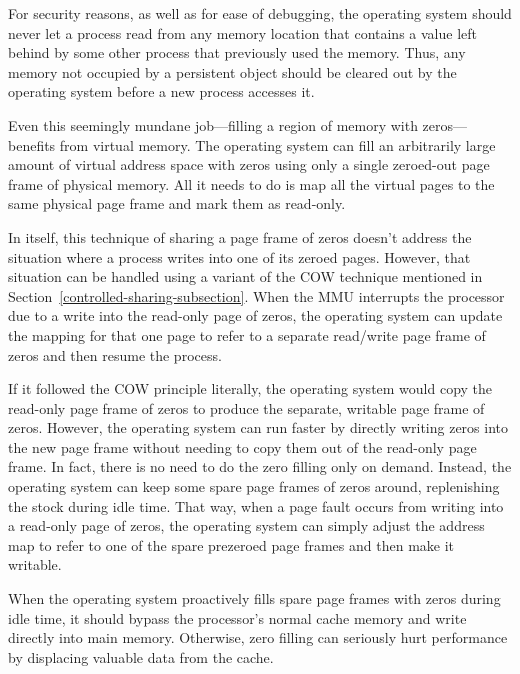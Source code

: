 For security reasons, as well as for ease of debugging, the operating
system should never let a process read from any memory location that
contains a value left behind by some other process that previously
used the memory.  Thus, any memory not occupied by a persistent
object should be cleared out by the operating system before a new process accesses it.

Even this seemingly mundane job---filling a region of memory with
zeros---benefits from virtual memory.  The operating system can fill
an arbitrarily large amount of virtual address space with zeros using
only a single zeroed-out page frame of physical memory.  All it needs
to do is map all the virtual pages to the same physical page frame
and mark them as read-only.

In itself, this technique of sharing a page frame of zeros
doesn't address the situation where a process writes into one of its
zeroed pages.  However, that situation can be handled using a variant of the COW technique
mentioned in Section~\ref{controlled-sharing-subsection}.  When the MMU
interrupts the processor due to a write into the read-only page of
zeros, the operating system can update the mapping for that one page
to refer to a separate read/write page frame of zeros and then resume the
process.

If it followed the COW principle literally, the operating system would
copy the read-only page frame of zeros to produce the separate,
writable page frame of zeros.  However, the operating system can run faster
by directly writing zeros into the new page frame without needing to
copy them out of the read-only page frame. In fact, there is no
need to do the zero filling only on demand.  Instead, the operating
system can keep some spare page frames of zeros around, replenishing
the stock during idle time.  That way, when a page fault occurs from
writing into a read-only page of zeros, the operating system can simply
adjust the address map to refer to one of the spare prezeroed page
frames and then make it writable.

When the operating system proactively fills spare page frames with zeros
during idle time, it should bypass the processor's normal cache memory
and write directly into main memory.  Otherwise, zero filling can
seriously hurt performance by displacing valuable data from the cache.

